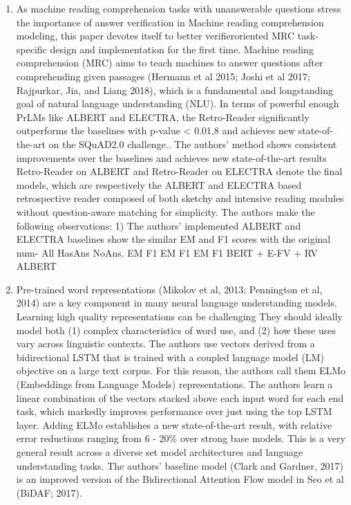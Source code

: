 \documentclass[11pt]{article}
\begin{document}
\begin{enumerate}
    \item As machine reading comprehension tasks with unanswerable questions stress the importance of answer verification in Machine reading comprehension modeling, this paper devotes itself to better verifieroriented MRC task-specific design and implementation for the first time.\cite{zhang2} Machine reading comprehension (MRC) aims to teach machines to answer questions after comprehending given passages (Hermann et al 2015; Joshi et al 2017; Rajpurkar, Jia, and Liang 2018), which is a fundamental and longstanding goal of natural language understanding (NLU). In terms of powerful enough PrLMs like ALBERT and ELECTRA, the Retro-Reader significantly outperforms the baselines with p-value < 0.01,8 and achieves new state-of-the-art on the SQuAD2.0 challenge..
    The authors' method shows consistent improvements over the baselines and achieves new state-of-the-art results
    Retro-Reader on ALBERT and Retro-Reader on ELECTRA denote the final models, which are respectively the ALBERT and ELECTRA based retrospective reader composed of both sketchy and intensive reading modules without question-aware matching for simplicity.
    The authors make the following observations: 1) The authors' implemented ALBERT and ELECTRA baselines show the similar EM and F1 scores with the original num- All HasAns NoAns. EM F1 EM F1 EM F1 BERT + E-FV + RV ALBERT\cite{zhang}
    \item Pre-trained word representations (Mikolov et al, 2013; Pennington et al, 2014) are a key component in many neural language understanding models.
    Learning high quality representations can be challenging
    They should ideally model both (1) complex characteristics of word use, and (2) how these uses vary across linguistic contexts.
    The authors use vectors derived from a bidirectional LSTM that is trained with a coupled language model (LM) objective on a large text corpus.
    For this reason, the authors call them ELMo (Embeddings from Language Models) representations.
    The authors learn a linear combination of the vectors stacked above each input word for each end task, which markedly improves performance over just using the top LSTM layer. Adding ELMo establishes a new state-of-the-art result, with relative error reductions ranging from 6 - 20\% over strong base models.
    This is a very general result across a diverse set model architectures and language understanding tasks.
    The authors' baseline model (Clark and Gardner, 2017) is an improved version of the Bidirectional Attention Flow model in Seo et al (BiDAF; 2017).

\end{enumerate}
\end{document}
